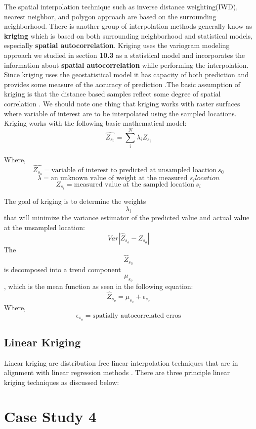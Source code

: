 \documentclass[
]{book}
\begin{document}
The spatial interpolation technique such as inverse distance weighting(IWD), nearest neighbor, and polygon approach are based on the surrounding neighborhood. There is another group of interpolation methods generally know as \textbf{kriging} \citep{krige_statistical_1951} which is based on both surrounding neighborhood and statistical models, especially \textbf{spatial autocorrelation}. Kriging uses the variogram modeling approach we studied in section \textbf{10.3} as a statistical model and incorporates the information about \textbf{spatial autocorrelation} while performing the interpolation. Since kriging uses the geostatistical model it has capacity of both prediction and provides some measure of the accuracy of prediction \citep{goovaerts_kriging_2008}.The basic assumption of kriging is that the distance based samples reflect some degree of spatial correlation \citep{goovaerts_kriging_2008}. We should note one thing that kriging works with raster surfaces where variable of interest are to be interpolated using the sampled locations. Kriging works with the following basic mathematical model:
\[\hat{Z_{s_0}}=\sum_{i}^N \lambda_{i}Z_{s_i}\]

Where, \[\hat{Z_{s_o}}=\text{variable of interest to predicted at unsampled loaction}\ s_0 \]
\[ \lambda=\text{an unknown value of weight at the measured } s_{i} location\]
\[Z_{s_i}=\text{measured value at the sampled location} \ s_i\]

The goal of kriging is to determine the weights \[\lambda_i\] that will minimize the variance estimator of the predicted value and actual value at the unsampled location:
\[ Var|\hat{Z}_{s_o}-Z_{s_o}|\]
The \[\hat{Z}_{s_0}\] is decomposed into a trend component \[\mu_{s_o}\], which is the mean function as seen in the following equation:
\[\hat{Z}_{s_o} = \mu_{s_o} + \epsilon_{s_o}\]
Where,\\
\[\epsilon_{s_o} = \text{spatially autocorrelated erros}\]

\hypertarget{linear-kriging}{%
\subsection{Linear Kriging}\label{linear-kriging}}

Linear kriging are distribution free linear interpolation techniques that are in alignment with linear regression methods \citep{asa_comparison_2012}. There are three principle linear kriging techniques as discussed below:

\hypertarget{case-study-4}{%
\section{Case Study 4}\label{case-study-4}}
\end{document}
